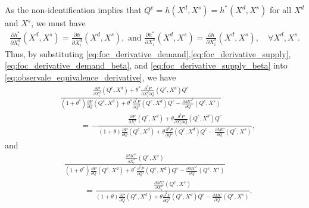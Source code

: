 \documentclass[11pt, a4paper]{article}
\theoremstyle{remark}
\begin{document}
 
As the non-identification implies that $Q^e = h(X^{d}, X^{s}) = h^{*}(X^{d}, X^{s})$ for all $X^{d}$ and $X^{s}$, we must have
\begin{align}
    \frac{\partial h^{*}}{\partial X^{d}_{i}}(X^{d}, X^{s})  = \frac{\partial h}{\partial X^{d}_{i}}(X^{d}, X^{s}), \text{  and  } \frac{\partial h^{*}}{\partial X^{s}_{i}}(X^{d}, X^{s})  = \frac{\partial h}{\partial X^{s}_{i}}(X^{d}, X^{s}), \quad \forall X^{d}, X^{s}. \label{eq:observale_equivalence_derivative}
\end{align}
Thus, by substituting \eqref{eq:foc_derivative_demand},\eqref{eq:foc_derivative_supply},\eqref{eq:foc_derivative_demand_beta}, and \eqref{eq:foc_derivative_supply_beta} into \eqref{eq:observale_equivalence_derivative}, we have
\begin{align}
    & \frac{\frac{\partial P}{\partial X^{d}_{i}}(Q^e, X^{d}) + \theta^{*}\frac{\partial^2 P}{\partial X^{d}_{i}\partial Q}(Q^e, X^{d})Q^e }{(1+\theta^{*})\frac{\partial P}{\partial Q}(Q^e, X^{d}) + \theta^{*}\frac{\partial^2 P}{\partial Q^2}(Q^e, X^{d})Q^e - \frac{\partial MC^{*}}{\partial Q}(Q^e, X^{s})}\\
    &\hspace{1cm} = - \frac{\frac{\partial P}{\partial X^{d}_{i}}(Q^e, X^{d}) + \theta \frac{\partial^2 P}{\partial X^{d}_{i}\partial Q}(Q^e, X^{d})Q^e }{(1+\theta)\frac{\partial P}{\partial Q}(Q^e, X^{d}) + \theta\frac{\partial^2 P}{\partial Q^2}(Q^e, X^{d})Q^e - \frac{\partial MC}{\partial Q}(Q^e, X^{s})}, \label{eq:derivative_q_x_d}
\end{align}
and
\begin{align}
    &\frac{\frac{\partial MC^{*}}{\partial X^{s}_{i}}(Q^e, X^{s})}{(1+\theta^{*})\frac{\partial P}{\partial Q}(Q^e, X^{d}) + \theta^{*}\frac{\partial^2 P}{\partial Q^2}(Q^e, X^{d})Q^e - \frac{\partial MC^{*}}{\partial Q}(Q^e, X^{s})}\\ 
    &\hspace{1cm} = \frac{\frac{\partial MC}{\partial X^{s}_{i}}(Q^e, X^{s})}{(1+\theta)\frac{\partial P}{\partial Q}(Q^e, X^{d}) + \theta\frac{\partial^2 P}{\partial Q^2}(Q^e, X^{d})Q^e - \frac{\partial MC}{\partial Q}(Q^e, X^{s})}.\label{eq:derivative_q_x_s}
\end{align}
\end{document}
